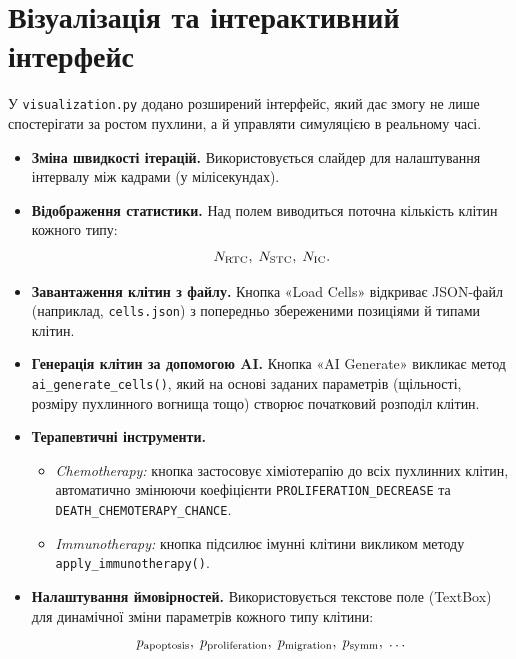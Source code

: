 \documentclass[12pt]{article}
\begin{document}
\medskip


\section{Візуалізація та інтерактивний інтерфейс}
\label{sec:visual-interface}

У \texttt{visualization.py} додано розширений інтерфейс, який дає змогу не лише спостерігати за ростом пухлини, а й управляти симуляцією в реальному часі.

\begin{itemize}
  \item \textbf{Зміна швидкості ітерацій.}  
    Використовується слайдер для налаштування інтервалу між кадрами (у мілісекундах).
  \item \textbf{Відображення статистики.}  
    Над полем виводиться поточна кількість клітин кожного типу: 
    \[
      N_{\rm RTC},\;N_{\rm STC},\;N_{\rm IC}.
    \]
  \item \textbf{Завантаження клітин з файлу.}  
    Кнопка «Load Cells» відкриває JSON-файл (наприклад, \texttt{cells.json}) з попередньо збереженими позиціями й типами клітин.
  \item \textbf{Генерація клітин за допомогою AI.}  
    Кнопка «AI Generate» викликає метод \texttt{ai\_generate\_cells()}, який на основі заданих параметрів (щільності, розміру пухлинного вогнища тощо) створює початковий розподіл клітин.
  \item \textbf{Терапевтичні інструменти.}
    \begin{itemize}
      \item \emph{Chemotherapy:} кнопка застосовує хіміотерапію до всіх пухлинних клітин, автоматично змінюючи коефіцієнти \texttt{PROLIFERATION\_DECREASE} та \texttt{DEATH\_CHEMOTERAPY\_CHANCE}.
      \item \emph{Immunotherapy:} кнопка підсилює імунні клітини викликом методу \texttt{apply\_immunotherapy()}.
    \end{itemize}
  \item \textbf{Налаштування ймовірностей.}  
    Використовується текстове поле (TextBox) для динамічної зміни параметрів кожного типу клітини:
    \[
      p_{\rm apoptosis},\;p_{\rm proliferation},\;p_{\rm migration},\;p_{\rm symm},\;\ldots
    \]
\end{itemize}
\end{document}
